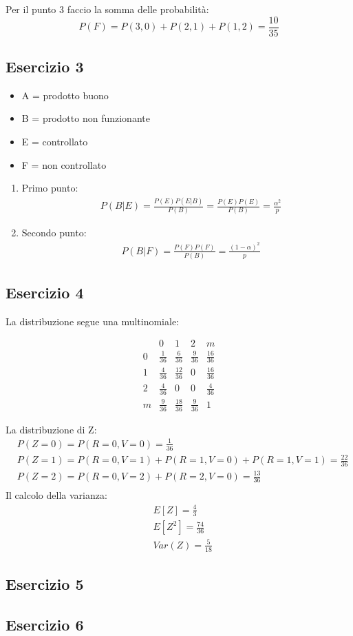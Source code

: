 \documentclass[12pt]{article}
\begin{document}
Per il punto 3 faccio la somma delle probabilità:
\[
P(F) = P(3,0) + P(2,1) + P(1,2) = \frac{10}{35}    
\]
\subsection*{Esercizio 3}

\begin{itemize}
    \item A = prodotto buono
    \item B = prodotto non funzionante
    \item E = controllato
    \item F = non controllato
\end{itemize}

\begin{enumerate}
    \item Primo punto:
    \begin{align*}
        &P(B|E) = \frac{P(E)P(E|B)}{P(B)} = \frac{P(E)P(E)}{P(B)} = \frac{\alpha^2}{p}
    \end{align*}
    \item Secondo punto:
    \begin{align*}
        &P(B|F) = \frac{P(F)P(F)}{P(B)} = \frac{(1-\alpha)^2}{p}
    \end{align*}
\end{enumerate}
\subsection*{Esercizio 4}

La distribuzione segue una multinomiale:

\begin{equation*}
    \renewcommand{\arraystretch}{1.5}
    \begin{array}{c|ccc|c}
          & 0 & 1 & 2 & m\\
    \hline
    0 & \frac{1}{36} & \frac{6}{36} & \frac{9}{36} & \frac{16}{36}\\
    1 & \frac{4}{36} & \frac{12}{36} & 0 & \frac{16}{36} \\
    2 & \frac{4}{36} & 0 & 0  & \frac{4}{36}\\ 
    \hline
    m & \frac{9}{36} & \frac{18}{36} & \frac{9}{36} & 1 
    \end{array}
\end{equation*}

La distribuzione di Z:
\begin{align*}
    &P(Z=0) = P(R=0,V=0) = \frac{1}{36} \\
    &P(Z=1) = P(R=0,V=1) + P(R=1,V=0) + P(R=1,V=1) = \frac{22}{36} \\
    &P(Z=2) = P(R=0,V=2) + P(R=2,V=0)  = \frac{13}{36} \\
\end{align*}
Il calcolo della varianza:
\begin{align*}
    &E[Z] = \frac{4}{3} \\
    &E[Z^2] = \frac{74}{36} \\
    &Var(Z) = \frac{5}{18}    
\end{align*}
    
\subsection*{Esercizio 5}

\subsection*{Esercizio 6}
\end{document}
